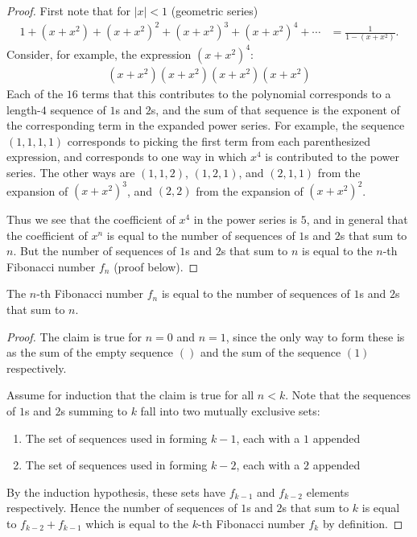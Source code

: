 \begin{proof}
First note that for $|x| < 1$ (geometric series)
\begin{align*}
  1 + (x + x^2) + (x + x^2)^2 + (x + x^2)^3 + (x + x^2)^4 + \cdots &= \frac{1}{1 - (x + x^2)}.
\end{align*}
Consider, for example, the expression $(x + x^2)^4$:
\begin{align*}
  (x + x^2)(x + x^2)(x + x^2)(x + x^2)
\end{align*}
Each of the $16$ terms that this contributes to the polynomial corresponds to a length-$4$ sequence
of $1$s and $2$s, and the sum of that sequence is the exponent of the corresponding term in the
expanded power series. For example, the sequence $(1,1,1,1)$ corresponds to picking the first term
from each parenthesized expression, and corresponds to one way in which $x^4$ is contributed to the
power series. The other ways are $(1,1,2)$, $(1,2,1)$, and $(2,1,1)$ from the expansion
of $(x + x^2)^3$, and $(2,2)$ from the expansion of $(x + x^2)^2$.

Thus we see that the coefficient of $x^4$ in the power series is $5$, and in general that the
coefficient of $x^n$ is equal to the number of sequences of $1$s and $2$s that sum to $n$. But the
number of sequences of $1$s and $2$s that sum to $n$ is equal to the $n$-th Fibonacci number $f_n$
(proof below).
\end{proof}


\begin{claim}
 The $n$-th Fibonacci number $f_n$ is equal to the number of sequences of $1$s and $2$s that sum to $n$.
\end{claim}

\begin{proof}
  The claim is true for $n=0$ and $n=1$, since the only way to form these is as the sum of the
  empty sequence $()$ and the sum of the sequence $(1)$ respectively.

  Assume for induction that the claim is true for all $n < k$. Note that the sequences of $1$s
  and $2$s summing to $k$ fall into two mutually exclusive sets:
  \begin{enumerate}
  \item The set of sequences used in forming $k-1$, each with a $1$ appended
  \item The set of sequences used in forming $k-2$, each with a $2$ appended
  \end{enumerate}
  By the induction hypothesis, these sets have $f_{k-1}$ and $f_{k-2}$ elements respectively. Hence
  the number of sequences of $1$s and $2$s that sum to $k$ is equal to $f_{k-2} + f_{k-1}$ which is
  equal to the $k$-th Fibonacci number $f_k$ by definition.
\end{proof}

